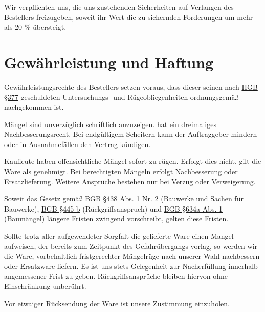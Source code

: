 \documentclass[fontsize=12pt,parskip=half]{scrartcl}
\begin{document}
\begin{contract}
Wir verpflichten uns, die uns zustehenden Sicherheiten auf Verlangen des Bestellers freizugeben, soweit ihr Wert die zu sichernden Forderungen um mehr als 20 \% übersteigt.

\end{contract}

\section{Gewährleistung und Haftung}

\begin{contract}

\Clause[title={Gewährleistungsrechte}]

Gewährleistungsrechte des Bestellers setzen voraus, dass dieser seinen nach \href{https://www.gesetze-im-internet.de/hgb/__377.html}{HGB §377} geschuldeten Untersuchungs- und Rügeobliegenheiten ordnungsgemäß nachgekommen ist.

\Clause[title={Mängel bei Werkleistungen}]

Mängel sind unverzüglich schriftlich anzuzeigen. \companyName{} hat ein dreimaliges Nachbesserungsrecht. Bei endgültigem Scheitern kann der Auftraggeber mindern oder in Ausnahmefällen den Vertrag kündigen.

\Clause[title={Mängel bei Warenlieferungen}]

Kaufleute haben offensichtliche Mängel sofort zu rügen. Erfolgt dies nicht, gilt die Ware als genehmigt. Bei berechtigten Mängeln erfolgt Nachbesserung oder Ersatzlieferung. Weitere Ansprüche bestehen nur bei Verzug oder Verweigerung.

Soweit das Gesetz gemäß \href{https://www.gesetze-im-internet.de/bgb/__438.html}{BGB §438 Abs. 1 Nr. 2} (Bauwerke und Sachen für Bauwerke), \href{https://www.gesetze-im-internet.de/bgb/__445.html}{BGB §445 b} (Rückgriffsanspruch) und \href{https://www.gesetze-im-internet.de/bgb/__634.html}{BGB §634a Abs. 1} (Baumängel) längere Fristen zwingend vorschreibt, gelten diese Fristen. 

Sollte trotz aller aufgewendeter Sorgfalt die gelieferte Ware einen Mangel aufweisen, der bereits zum Zeitpunkt des Gefahrübergangs vorlag, so werden wir die Ware, vorbehaltlich fristgerechter Mängelrüge nach unserer Wahl nachbessern oder Ersatzware liefern. Es ist uns stets Gelegenheit zur Nacherfüllung innerhalb angemessener Frist zu geben. Rückgriffsansprüche bleiben hiervon ohne Einschränkung unberührt.

Vor etwaiger Rücksendung der Ware ist unsere Zustimmung einzuholen.



\end{contract}
\end{document}
